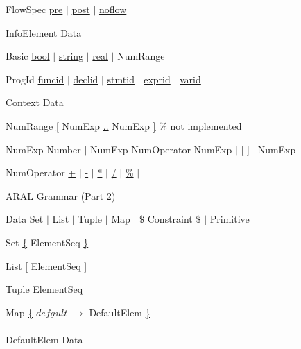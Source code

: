 {\begin{figure}[!ht]
\begin{GRAMMAR}
{FlowSpec}       \>\>\>\>\>\garrow\> \underline{pre} $\mid$ \underline{post} $\mid$ \underline{noflow}

{InfoElement}    \>\>\>\>\>\garrow\>  Data 

{Basic}          \>\>\>\>\>\garrow\> \underline{bool} $\mid$ \underline{string} $\mid$ \underline{real} $\mid$ NumRange

{ProgId}         \>\>\>\>\>\garrow\> \underline{funcid} $\mid$ \underline{declid} $\mid$ \underline{stmtid} $\mid$ \underline{exprid} $\mid$ \underline{varid}


{Context}        \>\>\>\>\>\garrow\> Data

{NumRange}       \>\>\>\>\>\garrow\> \underline{[} NumExp \underline{..} NumExp \underline {]} \% not implemented

{NumExp}         \>\>\>\>\>\garrow\> [-] Number
                 \>\>\>\>\> \>$\mid$ NumExp NumOperator NumExp
                 \>\>\>\>\> \>$\mid$ [-] \lb~NumExp \rb

{NumOperator}    \>\>\>\>\>\garrow\> \underline{+} $\mid$ \underline{-} $\mid$ \underline{*} $\mid$ \underline{/} $\mid$ \underline{\%} $\mid$ \underline{}

\end{GRAMMAR}
\caption{ARAL Grammar (Part 2)}
\label{fig:aralone}
\end{figure}

\begin{figure}[!ht]
\begin{GRAMMAR}
{Data}    \>\>\>\>\>\garrow\> Set
                 \>\>\>\>\> \>$\mid$ List
                 \>\>\>\>\> \>$\mid$ Tuple
                 \>\>\>\>\> \>$\mid$ Map
                 \>\>\>\>\> \>$\mid$ $\underline{\$}$ Constraint $\underline{\$}$
                 \>\>\>\>\> \>$\mid$ Primitive

{Set}            \>\>\>\>\>\garrow\> \underline{\{} ElementSeq \underline{\}}

{List}           \>\>\>\>\>\garrow\> \underline{[} ElementSeq \underline{]}

{Tuple}          \>\>\>\>\>\garrow\> \lb ElementSeq \rb

{Map}            \>\>\>\>\>\garrow\> \underline{\{} $\underline{default} $ $\underline{\rightarrow}$ DefaultElem  \underline{\}}

{DefaultElem} \>\>\>\>\>\garrow\> Data


\end{GRAMMAR}
\end{figure}}
